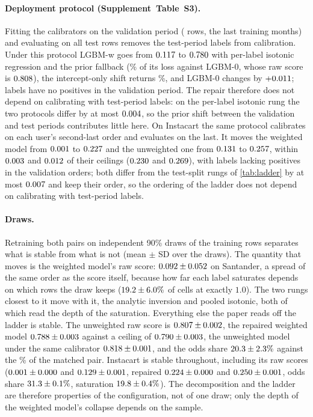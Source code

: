 \documentclass[sigconf,nonacm]{acmart}
\newcommand{\Sm}{\textsf{LGBM-w}\xspace}
\newcommand{\Nm}{\textsf{LGBM-0}\xspace}
\newcommand{\Supp}[1]{Supplement~#1}  %
\begin{document}
\paragraph{Deployment protocol (\Supp{Table~S3}).} Fitting the calibrators on the validation period (\nnValRows{} rows, the last training months) and evaluating on all \nnTest{} test rows removes the test-period labels from calibration. Under this protocol \Sm goes from $0.117$ to $0.780$ with per-label isotonic regression and the prior fallback (\ndepSrepairShare\% of its loss against \Nm, whose raw score is $0.808$), the intercept-only shift returns \ndepSoffsetShare\%, and \Nm changes by $+0.011$; \ndepSnDeadVal{} labels have no positives in the validation period. The repair therefore does not depend on calibrating with test-period labels: on the per-label isotonic rung the two protocols differ by at most $0.004$, so the prior shift between the validation and test periods contributes little here.
On Instacart the same protocol calibrates on each user's second-last order and evaluates on the last. It moves the weighted model from $0.001$ to $0.227$ and the unweighted one from $0.131$ to $0.257$, within $0.003$ and $0.012$ of their ceilings ($0.230$ and $0.269$), with \ndepISnDeadVal{} labels lacking positives in the validation orders; both differ from the test-split rungs of \cref{tab:ladder} by at most $0.007$ and keep their order, so the ordering of the ladder does not depend on calibrating with test-period labels.

\paragraph{Draws.} Retraining both pairs on \nseedN{} independent 90\% draws of the training rows separates what is stable from what is not (mean $\pm$ SD over the draws). The quantity that moves is the weighted model's raw score: $0.092 \pm 0.052$ on Santander, a spread of the same order as the score itself, because how far each label saturates depends on which rows the draw keeps ($19.2 \pm 6.0\%$ of cells at exactly $1.0$). The two rungs closest to it move with it, the analytic inversion and pooled isotonic, both of which read the depth of the saturation. Everything else the paper reads off the ladder is stable. The unweighted raw score is $0.807 \pm 0.002$, the repaired weighted model $0.788 \pm 0.003$ against a ceiling of $0.790 \pm 0.003$, the unweighted model under the same calibrator $0.818 \pm 0.001$, and the odds share $20.3 \pm 2.3\%$ against the \noddsShare\% of the matched pair. Instacart is stable throughout, including its raw scores ($0.001 \pm 0.000$ and $0.129 \pm 0.001$, repaired $0.224 \pm 0.000$ and $0.250 \pm 0.001$, odds share $31.3 \pm 0.1\%$, saturation $19.8 \pm 0.4\%$). The decomposition and the ladder are therefore properties of the configuration, not of one draw; only the depth of the weighted model's collapse depends on the sample.
\end{document}
